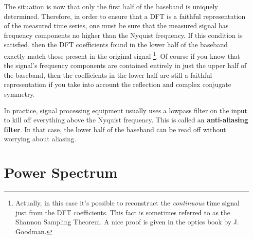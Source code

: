 The situation is now that only the first half of the baseband is uniquely determined. Therefore, in order to ensure that a DFT is a faithful representation of the measured time series, one must be sure that the measured signal has frequency components no higher than the Nyquist frequency. If this condition is satisfied, then the DFT coefficients found in the lower half of the baseband exactly match those present in the original signal \footnote{Actually, in this case it's possible to reconstruct the \emph{continuous} time signal just from the DFT coefficients. This fact is sometimes referred to as the Shannon Sampling Theorem. A nice proof is given in the optics book by J. Goodman.}. Of course if you know that the signal's frequency components are contained entirely in just the upper half of the baseband, then the coefficients in the lower half are still a faithful representation if you take into account the reflection and complex conjugate symmetry.

In practice, signal processing equipment usually uses a lowpass filter on the input to kill off everything above the Nyquist frequency. This is called an \textbf{anti-aliasing filter}. In that case, the lower half of the baseband can be read off without worrying about aliasing.


\section{Power Spectrum}

